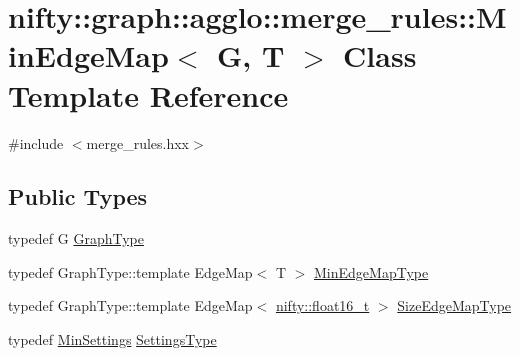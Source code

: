\hypertarget{classnifty_1_1graph_1_1agglo_1_1merge__rules_1_1MinEdgeMap}{}\section{nifty\+:\+:graph\+:\+:agglo\+:\+:merge\+\_\+rules\+:\+:Min\+Edge\+Map$<$ G, T $>$ Class Template Reference}
\label{classnifty_1_1graph_1_1agglo_1_1merge__rules_1_1MinEdgeMap}


{\ttfamily \#include $<$merge\+\_\+rules.\+hxx$>$}

\subsection*{Public Types}
\begin{DoxyCompactItemize}
\item 
typedef G \hyperlink{classnifty_1_1graph_1_1agglo_1_1merge__rules_1_1MinEdgeMap_aad794908266d5bf105eea1c117ffb70f}{Graph\+Type}
\item 
typedef Graph\+Type\+::template Edge\+Map$<$ T $>$ \hyperlink{classnifty_1_1graph_1_1agglo_1_1merge__rules_1_1MinEdgeMap_ab5ce11aa4046c0cdd9d99e934db91fac}{Min\+Edge\+Map\+Type}
\item 
typedef Graph\+Type\+::template Edge\+Map$<$ \hyperlink{namespacenifty_a20031b62bd5c16b943905d43a8ed361a}{nifty\+::float16\+\_\+t} $>$ \hyperlink{classnifty_1_1graph_1_1agglo_1_1merge__rules_1_1MinEdgeMap_ae785a9cf684a3c819ab624171d364a96}{Size\+Edge\+Map\+Type}
\item 
typedef \hyperlink{structnifty_1_1graph_1_1agglo_1_1merge__rules_1_1MinSettings}{Min\+Settings} \hyperlink{classnifty_1_1graph_1_1agglo_1_1merge__rules_1_1MinEdgeMap_ad0dd446b81440917b4dd852bd6bf1dac}{Settings\+Type}
\end{DoxyCompactItemize}
